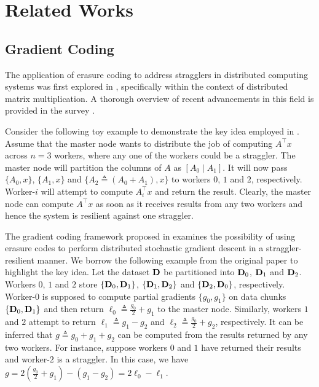\section{Related Works}\label{ch2:sec:related_work}

\subsection{Gradient Coding}

The application of erasure coding to address stragglers in distributed computing systems was first explored in \cite{Lee16}, specifically within the context of distributed matrix multiplication. A thorough overview of recent advancements in this field is provided in the survey \cite{codedComputingSurvey}.

Consider the following toy example to demonstrate the key idea employed in \cite{Lee16}. Assume that the master node wants to distribute the job of computing $A^\top x$ across $n=3$ workers, where any one of the workers could be a straggler. The master node will partition the columns of $A$ as $[A_0\mid A_1]$. It will now pass $\{A_0,x\}$, $\{A_1,x\}$ and $\{A_2\triangleq(A_0+A_1),x\}$ to workers $0$, $1$ and $2$, respectively. Worker-$i$ will attempt to compute $A_i^\top x$ and return the result. Clearly, the master node can compute $A^\top x$ as soon as it receives results from any two workers and hence the system is resilient against one straggler.

The gradient coding framework proposed in \cite{grad_coding} examines the possibility of using erasure codes to perform distributed stochastic gradient descent in a straggler-resilient manner. We borrow the following example from the original paper to highlight the key idea. Let the dataset $\mathbf{D}$ be partitioned into $\mathbf{D}_0$, $\mathbf{D}_1$ and $\mathbf{D}_2$. Workers $0$, $1$ and $2$ store $\{\mathbf{D}_0,\mathbf{D}_1\}$, $\{\mathbf{D}_1,\mathbf{D}_2\}$ and $\{\mathbf{D}_2,\mathbf{D}_0\}$, respectively. Worker-$0$ is supposed to compute partial gradients $\{g_0,g_1\}$ on data chunks $\{\mathbf{D}_0,\mathbf{D}_1\}$ and then return $\ell_0\triangleq\frac{g_0}{2}+g_1$ to the master node. Similarly, workers $1$ and $2$ attempt to return $\ell_1\triangleq g_1-g_2$ and $\ell_2\triangleq\frac{g_0}{2}+g_2$, respectively. It can be inferred that $g\triangleq g_0+g_1+g_2$ can be computed from the results returned by any two workers. For instance, suppose workers $0$ and $1$ have returned their results and worker-$2$ is a straggler. In this case, we have $g=2(\frac{g_0}{2}+g_1)-(g_1-g_2)=2\ell_0-\ell_1$.

